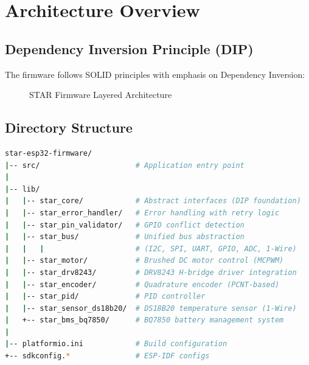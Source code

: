 \documentclass[11pt,letterpaper]{article}
\begin{document}
\section{Architecture Overview}

\subsection{Dependency Inversion Principle (DIP)}

The firmware follows SOLID principles with emphasis on Dependency Inversion:

\begin{figure}[H]
\centering
{}
\caption{STAR Firmware Layered Architecture}
\end{figure}

\subsection{Directory Structure}

\begin{lstlisting}[language=bash]
star-esp32-firmware/
|-- src/                      # Application entry point
|
|-- lib/
|   |-- star_core/            # Abstract interfaces (DIP foundation)
|   |-- star_error_handler/   # Error handling with retry logic
|   |-- star_pin_validator/   # GPIO conflict detection
|   |-- star_bus/             # Unified bus abstraction
|   |   |                     # (I2C, SPI, UART, GPIO, ADC, 1-Wire)
|   |-- star_motor/           # Brushed DC motor control (MCPWM)
|   |-- star_drv8243/         # DRV8243 H-bridge driver integration
|   |-- star_encoder/         # Quadrature encoder (PCNT-based)
|   |-- star_pid/             # PID controller
|   |-- star_sensor_ds18b20/  # DS18B20 temperature sensor (1-Wire)
|   +-- star_bms_bq7850/      # BQ7850 battery management system
|
|-- platformio.ini            # Build configuration
+-- sdkconfig.*               # ESP-IDF configs
\end{lstlisting}
\end{document}
